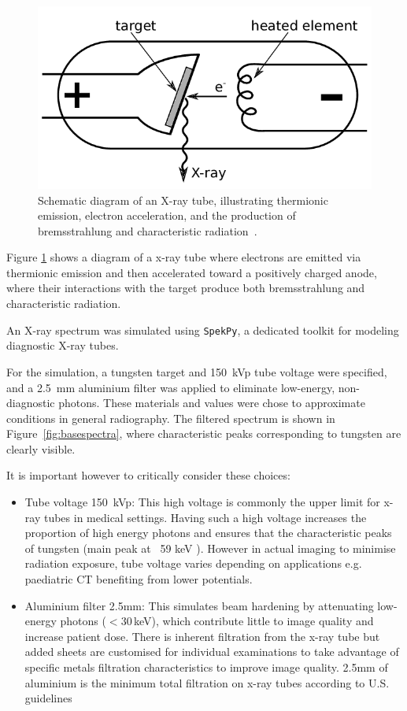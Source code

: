 \documentclass{article}
\theoremstyle{definition}
\begin{document}
\begin{figure}
  \includegraphics[width=\linewidth]{xray_tube.png}
  \caption{Schematic diagram of an X-ray tube, illustrating thermionic emission, electron acceleration, and the production of bremsstrahlung and characteristic radiation~\cite{Mason2018}.}
  \label{fig:X-ray tube}
\end{figure}

Figure \ref{fig:X-ray tube} shows a diagram of a x-ray tube where electrons are emitted via thermionic emission and then accelerated toward a positively charged anode, where their interactions with the target produce both bremsstrahlung and characteristic radiation.

An X-ray spectrum was simulated using \texttt{SpekPy}, a dedicated toolkit for modeling diagnostic X-ray tubes. 

For the simulation, a tungsten target and 150~kVp tube voltage were specified, and a 2.5~mm aluminium filter was applied to eliminate low-energy, non-diagnostic photons. These materials and values were chose to approximate conditions in general radiography. The filtered spectrum is shown in Figure~\ref{fig:basespectra}, where characteristic peaks corresponding to tungsten are clearly visible.

It is important however to critically consider these choices:

\begin{itemize}
	\item Tube voltage 150~kVp: This high voltage is commonly the upper limit for x-ray tubes in medical settings. Having such a high voltage increases the proportion of high energy photons and ensures that the characteristic peaks of tungsten (main peak at ~59 keV \cite{CharacteristicRadiation}). However in actual imaging to minimise radiation exposure, tube voltage varies depending on applications e.g. paediatric CT benefiting from lower potentials. 
	\item Aluminium filter 2.5mm: This simulates beam hardening by attenuating low-energy photons ($<30$ keV), which contribute little to image quality and increase patient dose. There is inherent filtration from the x-ray tube but added sheets are customised for individual examinations to take advantage of specific metals filtration characteristics to improve image quality. 2.5mm of aluminium is the minimum total filtration on x-ray tubes according to U.S. guidelines \cite{Filters}
\end{itemize}
\end{document}
